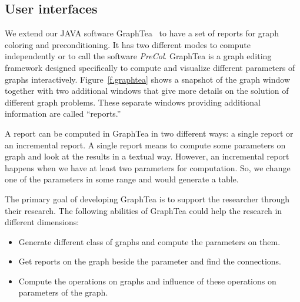 \documentclass[12pt, twoside,a4paper,toc=bibliography]{scrbook}
\newcommand{\todo}[1]{\textbf{#1}}
\begin{document}

\subsection{User interfaces}
\label{s.interfaces}
We extend our JAVA software GraphTea~
\cite{2014:07,2014:15,2014:16,2015:05,2015:06,2015:07,2015:08} to have a
set of reports for graph coloring and preconditioning. It has two different modes
to compute independently or to call the software \textit{PreCol}.
GraphTea is a graph editing framework designed specifically to compute and visualize
different parameters of graphs interactively.
Figure~\ref{f.graphtea} shows a snapshot of the
graph window together with two additional windows that give more details on the solution
of different graph problems. These separate windows providing additional information are
called ``reports.''

A report can be computed in GraphTea in two different ways:
a single report or an incremental report.
A single report means to compute some parameters on graph and look at the results
in a textual way. However, an incremental report happens when we have at least
two parameters for computation. So, we change one of the parameters in
some range and would generate a table.

The primary goal of developing GraphTea is to support the researcher through their research.
The following abilities of GraphTea could help the research in different dimensions:
\begin{itemize}
\item Generate different class of graphs and compute the parameters on them.
\item Get reports on the graph beside the parameter and find the connections.
\item Compute the operations on graphs and influence of these operations on parameters
of the graph.
\end{itemize}
\end{document}
